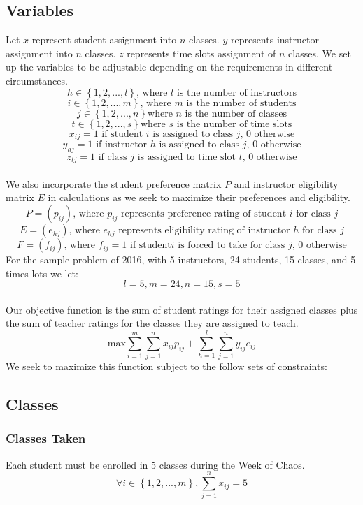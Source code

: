 \documentclass[11pt]{article}
\begin{document}
\subsection{Variables}
\indent Let $x$ represent student assignment into $n$ classes. $y$ represents instructor assignment into $n$ classes. $z$ represents time slots assignment of $n$ classes. We set up the variables to be adjustable depending on the requirements in different circumstances. 
\[h \in \left\{ {1,2,...,l}\right\}\text{, where 
}l \text{ is the number of instructors}\]
\[i \in \left\{ {1,2,...,m}\right\}\text{, where 
}m \text{ is the number of students}\]
\[j \in \left\{{1,2,...,n}\right\} \text{where } n \text{ is the number of classes} \]
\[t \in \left\{{1,2,...,s}\right\} \text{where } s \text{ is the number of time slots} \]
\[x_{ij} = 1 \text{ if student } i \text{ is assigned to class }j \text{, 0 otherwise}\]
\[y_{hj} = 1 \text{ if instructor } h  \text{ is assigned to class }j \text{, 0 otherwise}\]
\[z_{tj} = 1 \text{ if class } j  \text{ is assigned to time slot }t \text{, 0 otherwise}\]\\
We also incorporate the student preference matrix $P$ and instructor eligibility matrix $E$ in calculations as we seek to maximize their preferences and eligibility.
\[P =(p_{ij}) \text{, where } p_{ij} \text{ represents preference rating of student } i \text{ for class }j\]
\[E =(e_{hj}) \text{, where } e_{hj} \text{ represents eligibility rating of instructor } h \text{ for class }j\]
\[F =(f_{ij}) \text{, where } f_{ij} = 1 \text{ if student} i \text{ is forced to take for class }j \text{, 0 otherwise}\]
For the sample problem of 2016, with 5 instructors, 24 students, 15 classes, and 5 times lots we let:
\[l = 5, m = 24, n = 15, s = 5\]\\
\indent Our objective function is the sum of student ratings for their assigned classes plus the sum of teacher ratings for the classes they are assigned to teach.\\
\[\text{max} \sum_{i=1}^{m} \sum_{j=1}^{n}x_{ij}p_{ij} + \sum_{h=1}^{l}\sum_{j=1}^{n}y_{ij}e_{ij}\]
We seek to maximize this function subject to the follow sets of constraints:\\
\subsection{Classes}
\subsubsection{Classes Taken}
Each student must be enrolled in 5 classes during the Week of Chaos.
\[\forall i \in \left\{ {1,2,...,m}\right\},\sum_{j=1}^{n}x_{ij} = 5\]
\end{document}
